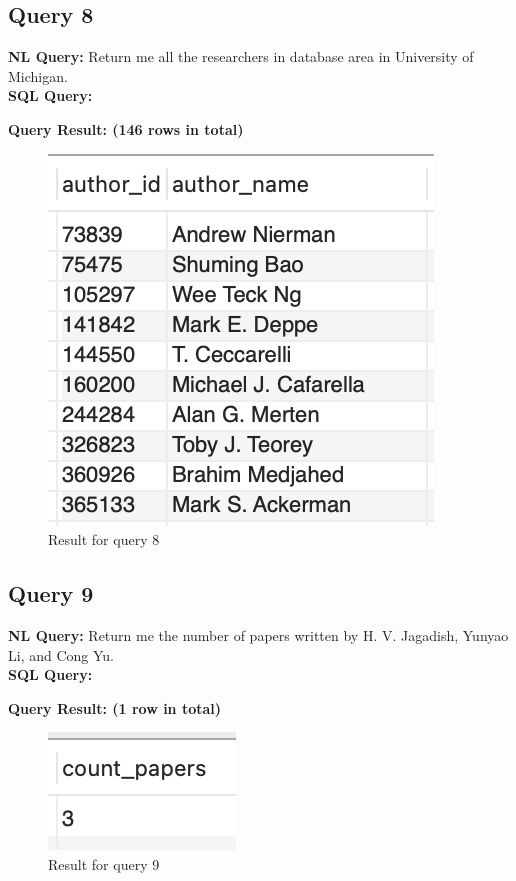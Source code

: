 \documentclass{article}
\begin{document}
\subsection{Query 8}
\textbf{NL Query:} Return me all the researchers in database area in University of Michigan.
\vspace{6 pt}
\\
\textbf{SQL Query:}

\textbf{Query Result: (146 rows in total)}
\begin{figure}[h]
	\centering
	\includegraphics[width=.15\textheight]{figures/q8_res.png}
	\caption{Result for query 8}
	\label{fig:009}
\end{figure}
\subsection{Query 9}
\textbf{NL Query:} Return me the number of papers written by H. V. Jagadish, Yunyao Li, and Cong Yu.
\vspace{6 pt}
\\
\textbf{SQL Query:}

\textbf{Query Result: (1 row in total)}
\begin{figure}[h]
	\centering
	\includegraphics[width=.08\textheight]{figures/q9_res.png}
	\caption{Result for query 9}
	\label{fig:010}
\end{figure}
\end{document}

